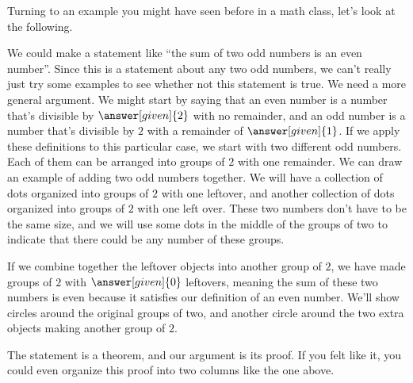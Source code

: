 \documentclass{ximera}
\begin{document}
Turning to an example you might have seen before in a math class, let's look at the following.
\begin{example}
We could make a statement like ``the sum of two odd numbers is an even number''. Since this is a statement about any two odd numbers, we can't really just try some examples to see whether not this statement is true. We need a more general argument. We might start by saying that an even number is a number that's divisible by $\answer[given]{2}$ with no remainder, and an odd number is a number that's divisible by $2$ with a remainder of $\answer[given]{1}$.  If we apply these definitions to this particular case, we start with two different odd numbers. Each of them can be arranged into groups of $2$ with one remainder. We can draw an example of adding two odd numbers together. We will have a collection of dots organized into groups of $2$ with one leftover, and another collection of dots organized into groups of $2$ with one left over. These two numbers don't have to be the same size, and we will use some dots in the middle of the groups of two to indicate that there could be any number of these groups.
\begin{image}
\end{image}
If we combine together the leftover objects into another group of $2$, we have made groups of $2$ with $\answer[given]{0}$ leftovers, meaning the sum of these two numbers is even because it satisfies our definition of an even number. We'll show circles around the original groups of two, and another circle around the two extra objects making another group of $2$.
\begin{image}
\end{image}

The statement is a theorem, and our argument is its proof. If you felt like it, you could even organize this proof into two columns like the one above.
\end{example}
\end{document}
